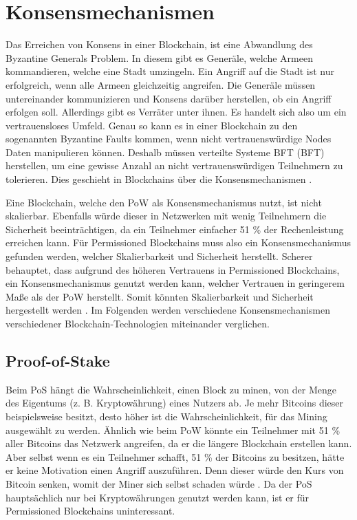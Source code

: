\section{Konsensmechanismen}
\label{sec:eval-konsens}
Das Erreichen von Konsens in einer Blockchain, ist eine Abwandlung des Byzantine Generals Problem. In diesem gibt es Generäle, welche Armeen kommandieren, welche eine Stadt umzingeln. Ein Angriff auf die Stadt ist nur erfolgreich, wenn alle Armeen gleichzeitig angreifen. Die Generäle müssen untereinander kommunizieren und Konsens darüber herstellen, ob ein Angriff erfolgen soll. Allerdings gibt es Verräter unter ihnen. Es handelt sich also um ein vertrauensloses Umfeld. Genau so kann es in einer Blockchain zu den sogenannten Byzantine Faults kommen, wenn nicht vertrauenswürdige Nodes Daten manipulieren können. Deshalb müssen verteilte Systeme \acl{BFT} (\acs{BFT}) herstellen, um eine gewisse Anzahl an nicht vertrauenswürdigen Teilnehmern zu tolerieren. Dies geschieht in Blockchains über die Konsensmechanismen \cite{ZhengBlockchainChallengesOpportunities2017}.

Eine Blockchain, welche den \acs{PoW} als Konsensmechanismus nutzt, ist nicht skalierbar. Ebenfalls würde dieser in Netzwerken mit wenig Teilnehmern die Sicherheit beeinträchtigen, da ein Teilnehmer einfacher 51 \% der Rechenleistung erreichen kann. Für Permissioned Blockchains muss also ein Konsensmechanismus gefunden werden, welcher Skalierbarkeit und Sicherheit herstellt. Scherer behauptet, dass aufgrund des höheren Vertrauens in Permissioned Blockchains, ein Konsensmechanismus genutzt werden kann, welcher Vertrauen in geringerem Maße als der \acs{PoW} herstellt. Somit könnten Skalierbarkeit und Sicherheit hergestellt werden \cite{SchererPerformanceScalabilityBlockchain2017}. Im Folgenden werden verschiedene Konsensmechanismen verschiedener Blockchain-Technologien miteinander verglichen.

\subsection{Proof-of-Stake}
Beim \acs{PoS} hängt die Wahrscheinlichkeit, einen Block zu minen, von der Menge des Eigentums (z. B. Kryptowährung) eines Nutzers ab. Je mehr Bitcoins dieser beispielsweise besitzt, desto höher ist die Wahrscheinlichkeit, für das Mining ausgewählt zu werden. Ähnlich wie beim \acs{PoW} könnte ein Teilnehmer mit 51 \% aller Bitcoins das Netzwerk angreifen, da er die längere Blockchain erstellen kann. Aber selbst wenn es ein Teilnehmer schafft, 51 \% der Bitcoins zu besitzen, hätte er keine Motivation einen Angriff auszuführen. Denn dieser würde den Kurs von Bitcoin senken, womit der Miner sich selbst schaden würde \cite{ZhengBlockchainChallengesOpportunities2017}. Da der PoS hauptsächlich nur bei Kryptowährungen genutzt werden kann, ist er für Permissioned Blockchains uninteressant.

